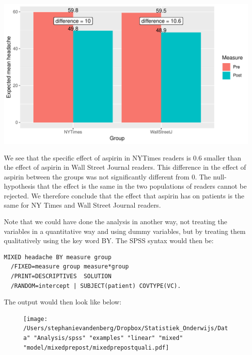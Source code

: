 \documentclass[]{report}\usepackage[]{graphicx}\usepackage[]{color}
\makeatletter
\def\maxwidth{ %
  \ifdim\Gin@nat@width>\linewidth
    \linewidth
  \else
    \Gin@nat@width
  \fi
}
\newenvironment{knitrout}{}{} %
\makeatother
\begin{document}
\begin{knitrout}
\color{fgcolor}

{\centering \includegraphics[width=\maxwidth]{figure/analysisprepostmixed3-1} 

}



\end{knitrout}


We see that the specific effect of aspirin in NYTimes readers is 0.6 smaller than the effect of aspirin in Wall Street Journal readers. This difference in the effect of aspirin between the groups was not significantly different from 0. The null-hypothesis that the effect is the same in the two populations of readers cannot be rejected. We therefore conclude that the effect that aspirin has on patients is the same for NY Times and Wall Street Journal readers. 

Note that we could have done the analysis in another way, not treating the variables in a quantitative way and using dummy variables, but by treating them qualitatively using the key word BY. The SPSS syntax would then be:

\begin{verbatim}
MIXED headache BY measure group 
  /FIXED=measure group measure*group
  /PRINT=DESCRIPTIVES  SOLUTION
  /RANDOM=intercept | SUBJECT(patient) COVTYPE(VC).
\end{verbatim}


The output would then look like below:


\begin{figure}[h]
    \begin{center}
       \texttt{[image: /Users/stephanievandenberg/Dropbox/Statistiek\_Onderwijs/Data" "Analysis/spss" "examples" "linear" "mixed" "model/mixedprepost/mixedprepostquali.pdf]}
    \end{center}
\end{figure}
\end{document}
